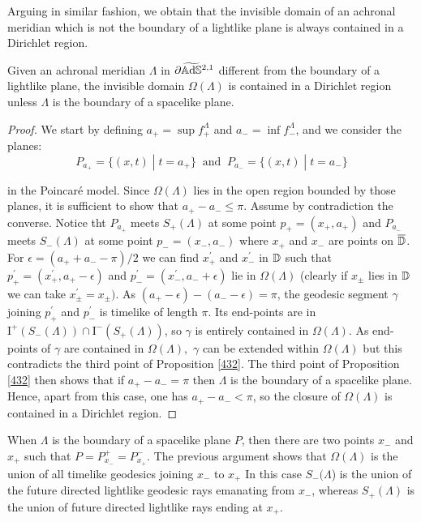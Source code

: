 Arguing in similar fashion, we obtain that the invisible domain of an achronal meridian which is not the boundary of a lightlike plane is always contained in a Dirichlet region. 

\begin{proposition}\label{433}
    Given an achronal meridian $\Lambda$ in $\partial\widetilde{\mathbb{A}\mathrm{d}\mathbb{S}}{}^{2,1}$ different from the boundary of a lightlike plane, the invisible domain $\Omega(\Lambda)$ is contained in a Dirichlet region unless $\Lambda$ is the boundary of a spacelike plane. 
\end{proposition}
\begin{proof}
    We start by defining $a_+=\sup f_+^{\Lambda}$ and $a_-=\inf f_-^{\Lambda}$, and we consider the planes: 
    \[
        P_{a_+}=\{(x,t)\;|\;t=a_+\} \;\;\text{and}\;\; P_{a_-}=\{(x,t)\;|\;t=a_-\}
   \]

   in the Poincaré model. Since $\Omega(\Lambda)$ lies in the open region bounded by those planes, it is sufficient to show that $a_+-a_-\leq\pi.$ Assume by contradiction the converse. Notice tht $P_{a_+}$ meets $S_+(\Lambda)$ at some point $p_+=(x_+,a_+)$ and $P_{a_-}$ meets $S_-(\Lambda)$ at some point $p_-=(x_-,a_-)$ where $x_+$ and $x_-$ are points on $\overline{\mathbb{D}}$. For $\epsilon=(a_+ + a_- -\pi )/2$ we can find $x^{\prime}_+$ and $x_-^{\prime} $ in $\mathbb{D}$ such that $p_+^{\prime}=(x^{\prime}_+,a_+-\epsilon)$ and $p_-^{\prime}=(x_-^{\prime},a_- +\epsilon)$ lie in $\Omega(\Lambda)$ (clearly if $x_\pm$ lies in $\mathbb{D}$ we can take $x_\pm^{\prime}=x_\pm)$. As $(a_+-\epsilon)-(a_- - \epsilon )=\pi$, the geodesic segment $\gamma$ joining $p_+^{\prime}$ and $p_-^{\prime}$ is timelike of length $\pi$. Its end-points are in $\text{I}^+(S_-(\Lambda))\cap\text{I}^-(S_+(\Lambda))$, so $\gamma$ is entirely contained in $\Omega(\Lambda)$. As end-points of $\gamma$ are contained in $\Omega(\Lambda),$ $\gamma$ can be extended within $\Omega(\Lambda)$ but this contradicts the third point of Proposition \ref{432}.       
   The third point of Proposition \ref{432} then shows that if $a_+-a_-=\pi$ then $\Lambda$ is the boundary of a spacelike plane. Hence, apart from this case, one has $a_+ - a_-<\pi$, so the closure of $\Omega(\Lambda)$ is contained in a Dirichlet region. 

\end{proof}
    
\begin{observation}
    When $\Lambda$ is the boundary of a spacelike plane $P$, then there are two points $x_-$ and $x_+$ such that $P=P_{x_-}^+=P_{x_+}^-.$ The previous argument shows that $\Omega(\Lambda)$ is the union of all timelike geodesics joining $x_-$ to $x_+$ In this case $S_-(\Lambda$) is the union of the future directed lightlike geodesic rays emanating from $x_-$, whereas $S_+(\Lambda)$ is the union of future directed lightlike rays ending at $x_+$.  
\end{observation}

